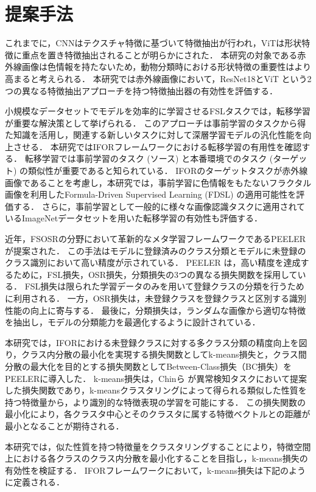 \documentclass[uplatex,dvipdfmx,10pt,twocolumn]{jsarticle}
\begin{document}
\section{提案手法}

これまでに，CNNはテクスチャ特徴に基づいて特徴抽出が行われ，ViTは形状特徴に重点を置き特徴抽出されることが明らかにされた．
本研究の対象である赤外線画像は色情報を持たないため，動物分類時における形状特徴の重要性はより高まると考えられる．
本研究では赤外線画像において，ResNet18とViT という2 つの異なる特徴抽出アプローチを持つ特徴抽出器の有効性を評価する．

小規模なデータセットでモデルを効率的に学習させるFSLタスクでは，転移学習が重要な解決策として挙げられる．
このアプローチは事前学習のタスクから得た知識を活用し，関連する新しいタスクに対して深層学習モデルの汎化性能を向上させる．
本研究ではIFORフレームワークにおける転移学習の有用性を確認する．
転移学習では事前学習のタスク (ソース) と本番環境でのタスク (ターゲット) の類似性が重要であると知られている．
IFORのターゲットタスクが赤外線画像であることを考慮し，本研究では，事前学習に色情報をもたないフラクタル画像を利用したFormula-Driven Supervised Learning (FDSL) の適用可能性を評価する．
さらに，事前学習として一般的に様々な画像認識タスクに適用されているImageNetデータセットを用いた転移学習の有効性も評価する．

近年，FSOSRの分野において革新的なメタ学習フレームワークであるPEELERが提案された．
この手法はモデルに登録済みのクラス分類とモデルに未登録のクラス識別において高い精度が示されている．
PEELER は，高い精度を達成するために，FSL損失，OSR損失，分類損失の3つの異なる損失関数を採用している．
FSL損失は限られた学習データのみを用いて登録クラスの分類を行うために利用される．
一方，OSR損失は，未登録クラスを登録クラスと区別する識別性能の向上に寄与する．
最後に，分類損失は，ランダムな画像から適切な特徴を抽出し，モデルの分類能力を最適化するように設計されている．

本研究では，IFORにおける未登録クラスに対する多クラス分類の精度向上を図り，クラス内分散の最小化を実現する損失関数としてk-means損失と，クラス間分散の最大化を目的とする損失関数としてBetween-Class損失（BC損失）をPEELERに導入した．
k-means損失は，Chinら \cite{k-means}が異常検知タスクにおいて提案した損失関数であり，k-meansクラスタリングによって得られる類似した性質を持つ特徴量から，より識別的な特徴表現の学習を可能にする．
この損失関数の最小化により，各クラスタ中心とそのクラスタに属する特徴ベクトルとの距離が最小となることが期待される．

本研究では，似た性質を持つ特徴量をクラスタリングすることにより，特徴空間上における各クラスのクラス内分散を最小化することを目指し，k-means損失の有効性を検証する．
IFORフレームワークにおいて，k-means損失は下記のように定義される．
\end{document}
